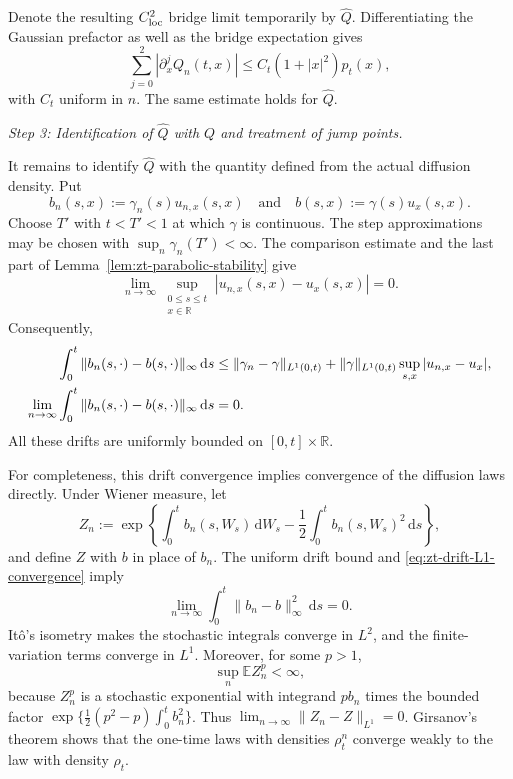\documentclass[10pt]{amsart}
\theoremstyle{definition}
\theoremstyle{remark}
\numberwithin{equation}{section}
\newcommand{\R}{\mathbb R}
\newcommand{\E}{\mathbb E}
\newcommand{\1}{\mathbf 1}
\newcommand{\dd}{\,\mathrm d}
\begin{document}
Denote the resulting $C^2_{\rm loc}$ bridge limit temporarily by $\widehat Q$. Differentiating the Gaussian prefactor as well as the bridge expectation gives
\begin{equation}
 \sum_{j=0}^2|\partial_x^jQ_n(t,x)|
 \leq C_t(1+|x|^2)p_t(x),
 \label{eq:zt-Q-Gaussian-derivative-bound}
\end{equation}
with $C_t$ uniform in $n$.  The same estimate holds for $\widehat Q$.

\smallskip
\noindent\emph{Step 3: Identification of $\widehat Q$ with $Q$ and treatment of jump points.}

It remains to identify $\widehat Q$ with the quantity defined from the actual diffusion density.  Put
\begin{equation*}
 b_n(s,x):=\gamma_n(s)u_{n,x}(s,x)\quad\text{and}\quad
 b(s,x):=\gamma(s)u_x(s,x).
\end{equation*}
Choose $T'$ with $t<T'<1$ at which $\gamma$ is continuous.  The step approximations may be chosen with $\sup_n\gamma_n(T')<\infty$.  The comparison estimate and the last part of Lemma~\ref{lem:zt-parabolic-stability} give
\begin{equation*}
 \lim_{n\to\infty}
 \sup_{\substack{0\leq s\leq t\\x\in\R}}
 |u_{n,x}(s,x)-u_x(s,x)|=0.
\end{equation*}
Consequently,
\begin{align}
 \int_0^t\|b_n(s,\cdot)-b(s,\cdot)\|_\infty\dd s
 &\leq\|\gamma_n-\gamma\|_{L^1(0,t)}
 +\|\gamma\|_{L^1(0,t)}
   \sup_{s,x}|u_{n,x}-u_x|,\notag\\
 \lim_{n\to\infty}\int_0^t
 \|b_n(s,\cdot)-b(s,\cdot)\|_\infty\dd s&=0.
 \label{eq:zt-drift-L1-convergence}
\end{align}
All these drifts are uniformly bounded on $[0,t]\times\R$.

For completeness, this drift convergence implies convergence of the diffusion laws directly.  Under Wiener measure, let
\begin{equation*}
 Z_n:=\exp\left\{\int_0^tb_n(s,W_s)\dd W_s
 -\frac12\int_0^tb_n(s,W_s)^2\dd s\right\},
\end{equation*}
and define $Z$ with $b$ in place of $b_n$.  The uniform drift bound and \eqref{eq:zt-drift-L1-convergence} imply
\begin{equation*}
 \lim_{n\to\infty}\int_0^t\|b_n-b\|_\infty^2\dd s=0.
\end{equation*}
It\^o's isometry makes the stochastic integrals converge in $L^2$, and the finite-variation terms converge in $L^1$.  Moreover, for some $p>1$,
\begin{equation*}
 \sup_n\E Z_n^p<\infty,
\end{equation*}
because $Z_n^p$ is a stochastic exponential with integrand $pb_n$ times the bounded factor $\exp\{\frac12(p^2-p)\int_0^tb_n^2\}$. Thus $\lim_{n\to\infty}\|Z_n-Z\|_{L^1}=0$. Girsanov's theorem shows that the one-time laws with densities $\rho_t^n$ converge weakly to the law with density $\rho_t$.
\end{document}
